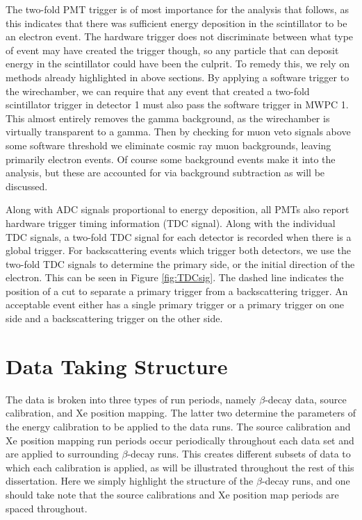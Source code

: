 
The two-fold PMT trigger is of most importance for the analysis that follows, as this indicates
that there was sufficient energy deposition in the scintillator to be an electron event.
The hardware trigger does not
discriminate between what type of event may have created the trigger though, so any particle
that can deposit energy in the scintillator could have been the culprit. To remedy this, we rely
on methods already highlighted in above sections. By applying a software trigger to
the wirechamber, we can require that any event that created a two-fold scintillator trigger
in detector 1 must also pass the software trigger in MWPC 1. This almost entirely removes the
gamma background, as the wirechamber is virtually transparent to a gamma.
Then by checking for muon veto signals above some software threshold we eliminate
cosmic ray muon backgrounds, leaving primarily electron events. Of course
some background events make it into the analysis, but these are accounted for
via background subtraction as will be discussed.

Along with ADC signals proportional to energy deposition, all PMTs also report hardware trigger
timing information (TDC signal). Along with the individual TDC signals, a two-fold TDC signal for
each detector is recorded when there is a global trigger.
For backscattering events which trigger both detectors, we use the two-fold TDC signals
to determine the primary side, or the initial direction of the electron. This can be seen in
Figure \ref{fig:TDCsig}. The dashed line indicates the position of a cut to separate a primary trigger
from a backscattering trigger. An acceptable event either has a single primary trigger or a primary
trigger on one side and a backscattering trigger on the other side. 





\section{Data Taking Structure}

The data is broken into three types of run periods, namely $\beta$-decay data, source calibration, and
Xe position mapping. The latter two determine the parameters of the energy calibration to be
applied to the data runs. The source calibration and Xe position mapping run periods
occur periodically throughout each data set and are applied to surrounding $\beta$-decay runs. This
creates different subsets of data to which each calibration is applied, as will be illustrated
throughout the rest of this dissertation. Here we simply highlight the structure of the
$\beta$-decay runs, and one should take note that the source calibrations and Xe position map periods
are spaced throughout.

